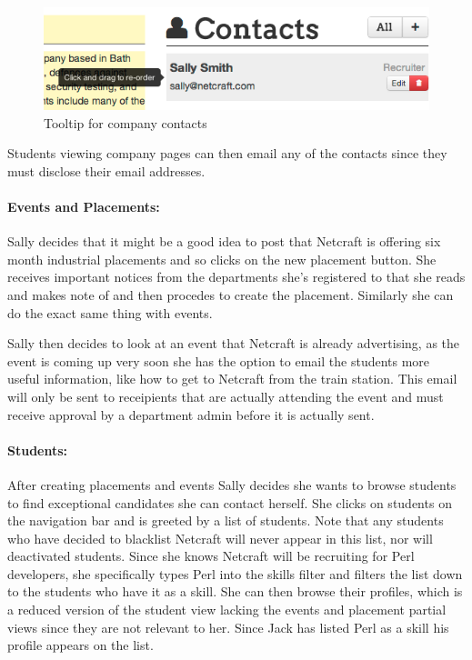     \begin{figure}[H]\centering
    \includegraphics[scale=0.5]{images/user_experiences/company/netcraft_company_contact_tooltip}
    \caption{Tooltip for company contacts}
    \end{figure}
    Students viewing company pages can then email any of the contacts since they must disclose their email addresses.

  \paragraph{Events and Placements:}
    Sally decides that it might be a good idea to post that Netcraft is offering six month industrial placements and so clicks on the new placement button. 
    She receives important notices from the departments she's registered to that she reads and makes note of and then procedes to create the placement.
    Similarly she can do the exact same thing with events.

    Sally then decides to look at an event that Netcraft is already advertising, as the event is coming up very soon she has the option to email the students more useful information, like how to get to Netcraft from the train station.
    This email will only be sent to receipients that are actually attending the event and must receive approval by a department admin before it is actually sent.
  
  \paragraph{Students:}
    After creating placements and events Sally decides she wants to browse students to find exceptional candidates she can contact herself. She clicks on students on the navigation bar and is greeted by a list of students. Note that any students who have decided to blacklist Netcraft will never appear in this list, nor will deactivated students.
    Since she knows Netcraft will be recruiting for Perl developers, she specifically types Perl into the skills filter
    and filters the list down to the students who have it as a skill.
    She can then browse their profiles, which is a reduced version of the student view lacking the events and placement partial views since they are not relevant to her. Since Jack has listed Perl as a skill his profile appears on the list.

